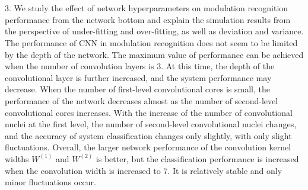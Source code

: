 \begin{englishabstract}
\\~\\
3. We study the effect of network hyperparameters on modulation recognition performance from the network bottom and explain the simulation results from the perspective of under-fitting and over-fitting, as well as deviation and variance. The performance of CNN in modulation recognition does not seem to be limited by the depth of the network. The maximum value of performance can be achieved when the number of convolution layers is $3$. At this time, the depth of the convolutional layer is further increased, and the system performance may decrease. When the number of first-level convolutional cores is small, the performance of the network decreases almost as the number of second-level convolutional cores increases. With the increase of the number of convolutional nuclei at the first level, the number of second-level convolutional nuclei changes, and the accuracy of system classification changes only slightly, with only slight fluctuations. Overall, the larger network performance of the convolution kernel widths $W^{(1)}$ and $W^{(2)}$ is better, but the classification performance is increased when the convolution width is increased to $7$. It is relatively stable and only minor fluctuations occur.
\\

\end{englishabstract}

%
%

